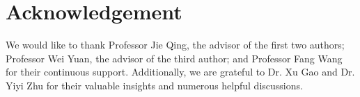 \documentclass[12pt]{amsart}
\begin{document}
\section*{Acknowledgement}
We would like to thank Professor Jie Qing, the advisor of the first two authors; Professor Wei Yuan, the advisor of the third author; and Professor Fang Wang for their continuous support. Additionally, we are grateful to Dr. Xu Gao and Dr. Yiyi Zhu for their valuable insights and numerous helpful discussions.


\printbibliography
\end{document}
